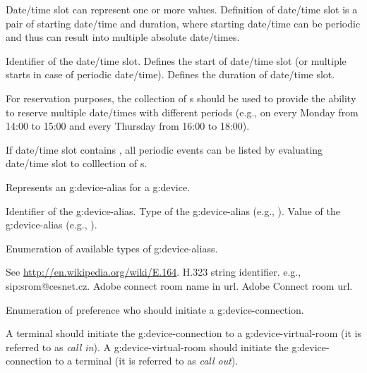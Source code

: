 \begin{Api}
Date/time slot can represent one or more  values. Definition of date/time slot is a pair of starting date/time and duration, where starting date/time can be periodic and thus can result into multiple absolute date/times.
\begin{ApiClassAttributes}
 Identifier of the date/time slot.
Defines the start of date/time slot (or multiple starts in case of periodic date/time).
Defines the duration of date/time slot.
\end{ApiClassAttributes}

For reservation purposes, the collection of s should be used to provide the ability to reserve multiple date/times with different periods (e.g., on every Monday from 14:00 to 15:00 and every Thursday from 16:00 to 18:00).

If date/time slot contains , all periodic events can be listed by evaluating date/time slot to colllection of s.

Represents an \gls{g:device-alias} for a \gls{g:device}.
\begin{ApiClassAttributes}
 Identifier of the \gls{g:device-alias}.
 Type of the \gls{g:device-alias} (e.g., ).
 Value of the \gls{g:device-alias} (e.g., ).
\end{ApiClassAttributes}

Enumeration of available types of \glspl{g:device-alias}.
\begin{ApiEnumValues}
 See \url{http://en.wikipedia.org/wiki/E.164}.
 H.323 string identifier.
 e.g., sip:srom@cesnet.cz.
 Adobe connect room name in url.
 Adobe Connect room url.
\end{ApiEnumValues}

Enumeration of preference who should initiate a \gls{g:device-connection}.
\begin{ApiEnumValues}
 A terminal should initiate the \gls{g:device-connection} to a \gls{g:device-virtual-room} (it is referred to as \emph{call in}).
 A \gls{g:device-virtual-room} should initiate the \gls{g:device-connection} to a terminal (it is referred to as \emph{call out}).
\end{ApiEnumValues}


\end{Api}
